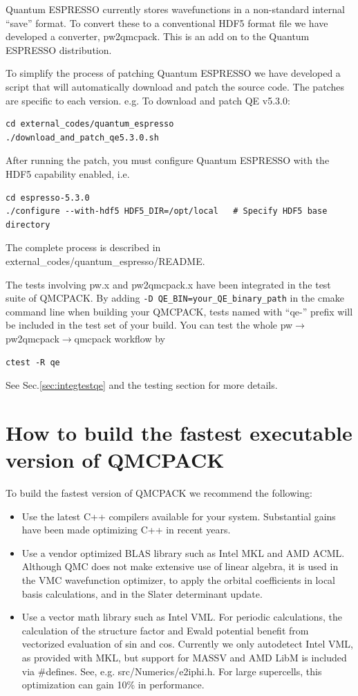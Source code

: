 Quantum ESPRESSO currently stores wavefunctions in a non-standard internal
``save'' format. To convert these to a conventional HDF5 format file
we have developed a converter, pw2qmcpack. This is an add on to the
Quantum ESPRESSO distribution.

To simplify the process of patching Quantum ESPRESSO we have developed
a script that will automatically download and patch the source
code. The patches are specific to each version. e.g. To download and
patch QE v5.3.0:
\begin{verbatim}
cd external_codes/quantum_espresso
./download_and_patch_qe5.3.0.sh
\end{verbatim}
After running the patch, you must configure Quantum ESPRESSO with
the HDF5 capability enabled, i.e.
\begin{verbatim}
cd espresso-5.3.0
./configure --with-hdf5 HDF5_DIR=/opt/local   # Specify HDF5 base directory
\end{verbatim}

The complete process is described in external\_codes/quantum\_espresso/README.

The tests involving pw.x and pw2qmcpack.x have been integrated in the test suite of QMCPACK.
By adding \texttt{-D QE\_BIN=your\_QE\_binary\_path} in the cmake command line when building your QMCPACK,
tests named with ``qe-'' prefix will be included in the test set of your build.
You can test the whole pw$\to$pw2qmcpack$\to$qmcpack workflow by
\begin{verbatim}
ctest -R qe
\end{verbatim}
See Sec.\ref{sec:integtestqe} and the testing section for more details.

\section{How to build the fastest executable version of QMCPACK}
\label{sec:buildperformance}
To build the fastest version of QMCPACK we recommend the following:
\begin{itemize}
\item Use the latest C++ compilers available for your
  system. Substantial gains have been made optimizing C++ in recent
  years.
\item Use a vendor optimized BLAS library such as Intel MKL and AMD ACML. Although
  QMC does not make extensive use of linear algebra, it is used in the
  VMC wavefunction optimizer, to apply the orbital coefficients in local basis
  calculations, and in the Slater determinant update.
\item Use a vector math library such as Intel VML.  For periodic
  calculations, the calculation of the structure factor and Ewald
  potential benefit from vectorized evaluation of sin and
  cos. Currently we only autodetect Intel VML, as provided with MKL,
  but support for MASSV and AMD LibM is included via \#defines. See,
  e.g. src/Numerics/e2iphi.h. For
  large supercells, this optimization can gain 10\% in performance.
\end{itemize}

